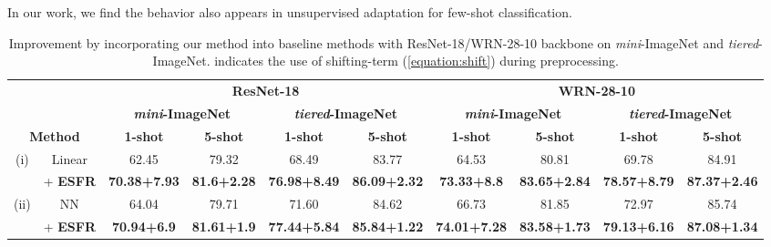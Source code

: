 \documentclass{article}
\begin{document}
In our work, we find the behavior also appears in unsupervised adaptation for few-shot classification.  \begin{table*}[t]
	\caption{Improvement by incorporating our method into baseline methods with ResNet-18/WRN-28-10 backbone on \textit{mini}-ImageNet and \textit{tiered}-ImageNet.  indicates the use of shifting-term (\ref{equation:shift}) during preprocessing.}
	\label{table:addition2}
	\begin{small}
		\begin{center}
			\begin{tabular}{cccccccccc}
				\hline
				& & \multicolumn{4}{c}{\textbf{ResNet-18}} & \multicolumn{4}{c}{\textbf{WRN-28-10}} \\
				& & \multicolumn{2}{c}{\textbf{\textit{mini}-ImageNet}} & \multicolumn{2}{c}{\textbf{\textit{tiered}-ImageNet}} & \multicolumn{2}{c}{\textbf{\textit{mini}-ImageNet}} & \multicolumn{2}{c}{\textbf{\textit{tiered}-ImageNet}} \\
				\multicolumn{2}{c}{\textbf{Method}} & \textbf{1-shot} & \textbf{5-shot} & \textbf{1-shot} & \textbf{5-shot}& \textbf{1-shot} & \textbf{5-shot}& \textbf{1-shot} & \textbf{5-shot} \\ \hline
				\multirow{2}{*}{(i)} & Linear & 62.45 & 79.32 & 68.49 & 83.77 & 64.53 & 80.81 & 69.78 & 84.91 \\
				&\cellcolor[HTML]{EFEFEF} + \textbf{ESFR} &\cellcolor[HTML]{EFEFEF} \textbf{70.38{\scriptsize+7.93}} &\cellcolor[HTML]{EFEFEF} \textbf{81.6{\scriptsize+2.28}} &\cellcolor[HTML]{EFEFEF} \textbf{76.98{\scriptsize+8.49}} &\cellcolor[HTML]{EFEFEF} \textbf{86.09{\scriptsize+2.32}} &\cellcolor[HTML]{EFEFEF} \textbf{73.33{\scriptsize+8.8}} &\cellcolor[HTML]{EFEFEF} \textbf{83.65{\scriptsize+2.84}} &\cellcolor[HTML]{EFEFEF} \textbf{78.57{\scriptsize+8.79}} &\cellcolor[HTML]{EFEFEF} \textbf{87.37{\scriptsize+2.46}} \\ \hline
				\multirow{2}{*}{(ii)} & NN & 64.04 & 79.71 & 71.60 & 84.62 & 66.73 & 81.85 & 72.97 & 85.74 \\
				&\cellcolor[HTML]{EFEFEF} + \textbf{ESFR} &\cellcolor[HTML]{EFEFEF} \textbf{70.94{\scriptsize+6.9}} &\cellcolor[HTML]{EFEFEF} \textbf{81.61{\scriptsize+1.9}} &\cellcolor[HTML]{EFEFEF} \textbf{77.44{\scriptsize+5.84}} &\cellcolor[HTML]{EFEFEF} \textbf{85.84{\scriptsize+1.22}} &\cellcolor[HTML]{EFEFEF} \textbf{74.01{\scriptsize+7.28}} &\cellcolor[HTML]{EFEFEF} \textbf{83.58{\scriptsize+1.73}} &\cellcolor[HTML]{EFEFEF} \textbf{79.13{\scriptsize+6.16}} &\cellcolor[HTML]{EFEFEF} \textbf{87.08{\scriptsize+1.34}} \\ \hline

\end{tabular}
\end{center}
\end{small}
\end{table*}
\end{document}
